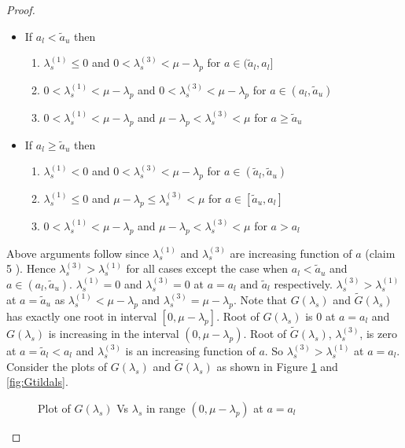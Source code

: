 \documentclass[12pt, a4paper]{report}
\begin{document}
\begin{proof}
\begin{itemize}
\item If $a_l < \tilde{a}_u$ then
\begin{enumerate}
\item $\lambda_s^{(1)} \leq 0$ and $0 < \lambda_s^{(3)} < \mu-\lambda_p$ for $a \in (\tilde{a}_l, a_l]$
\item $0<\lambda_s^{(1)} < \mu-\lambda_p$ and $0 < \lambda_s^{(3)} < \mu-\lambda_p$ for $a \in (a_l, \tilde{a}_u)$
\item $0<\lambda_s^{(1)} < \mu-\lambda_p$ and $\mu-\lambda_p < \lambda_s^{(3)} < \mu$ for $a \ge \tilde{a}_u$
\end{enumerate}
\item If $a_l \ge \tilde{a}_u$ then
\begin{enumerate}
\item $\lambda_s^{(1)} < 0$ and $0 < \lambda_s^{(3)} < \mu-\lambda_p$ for $a \in (\tilde{a}_l, \tilde{a}_u)$
\item $\lambda_s^{(1)} \le 0$ and $\mu-\lambda_p \le \lambda_s^{(3)} < \mu$ for $a \in [\tilde{a}_u,a_l ]$
\item $0<\lambda_s^{(1)} < \mu-\lambda_p$ and $\mu-\lambda_p < \lambda_s^{(3)} < \mu$ for $a >a_l$
\end{enumerate}
\end{itemize}
Above arguments follow since $\lambda_s^{(1)}$ and $\lambda_s^{(3)}$ are increasing function of $a$ (claim 5 \cite{Sudhir_standard_style}). Hence $\lambda_s^{(3)} > \lambda_s^{(1)}$ for all cases except the case when $a_l < \tilde{a}_u$ and $a \in (a_l, \tilde{a}_u)$. $\lambda_s^{(1)} = 0$ and $\lambda_s^{(3)} = 0 $ at $a = a_l\text{ and }\tilde{a}_l$ respectively. $\lambda_s^{(3)} > \lambda_s^{(1)}$ at $a= \tilde{a}_u$ as $\lambda_s^{(1)}<\mu-\lambda_p$ and $\lambda_s^{(3)} = \mu-\lambda_p$. Note that $G(\lambda_s)$ and $\tilde{G}(\lambda_s)$ has exactly one root in interval $[0, \mu-\lambda_p]$. Root of $G(\lambda_s)$ is 0 at $a=a_l$ and $G(\lambda_s)$ is increasing in the interval $(0, \mu-\lambda_p)$. Root of $\tilde{G}(\lambda_s)$, $\lambda_s^{(3)}$, is zero at $a=\tilde{a}_l < a_l$ and $\lambda_s^{(3)}$ is an increasing function of $a$. So $\lambda_s^{(3)} > \lambda_s^{(1)}$ at $a=a_l$. Consider the plots of $G(\lambda_s)$ and $\tilde{G}(\lambda_s)$ as shown in Figure \ref{fig:Gls} and \ref{fig:Gtildals}.
\begin{figure}[ht]
\begin{minipage}[b]{0.5\linewidth}

\caption{Plot of $G(\lambda_s)$ Vs $\lambda_s$ in range $(0, \mu-\lambda_p)$ at $a=a_l$}\label{fig:Gls}
\end{minipage}

\end{figure}
\end{proof}
\end{document}
